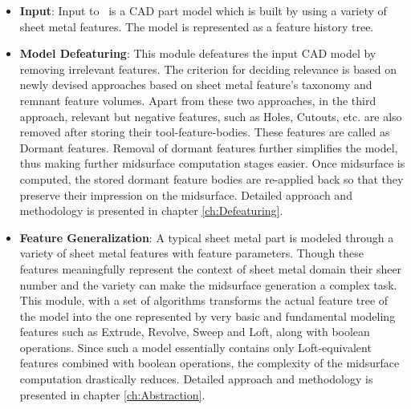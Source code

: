 \begin{itemize}[noitemsep,topsep=2pt,parsep=2pt,partopsep=2pt]

\item \textbf{Input}:  Input to \mysystemname~is a CAD part model which is built by using a variety of sheet metal features. The model is represented as a feature history tree.

\item \textbf{Model Defeaturing}: This module defeatures the input CAD model by removing irrelevant features. The criterion for deciding relevance is based on newly devised approaches based on sheet metal feature's taxonomy and remnant feature volumes. Apart from these two approaches, in the third approach, relevant but negative features, such as Holes, Cutouts, etc. are also removed after storing their tool-feature-bodies. These features are called as Dormant features. Removal of dormant features further simplifies the model, thus making further midsurface computation stages easier. Once midsurface is computed, the stored dormant feature bodies are re-applied back so that they preserve their impression on the midsurface. Detailed approach and methodology is presented in chapter \ref{ch:Defeaturing}.


\item \textbf{Feature Generalization}: A typical sheet metal part is modeled through a variety of sheet metal features with feature parameters. Though these features meaningfully represent the context of sheet metal domain their sheer number and the variety can make the midsurface generation a complex task.  This module, with a set of algorithms transforms the actual feature tree of the model into the one represented by very basic and fundamental modeling features such as Extrude, Revolve, Sweep and Loft, along with boolean operations.   Since such a model essentially contains only Loft-equivalent features combined with boolean operations, the complexity of the midsurface computation drastically reduces. Detailed approach and methodology is presented in chapter \ref{ch:Abstraction}.


\end{itemize}
